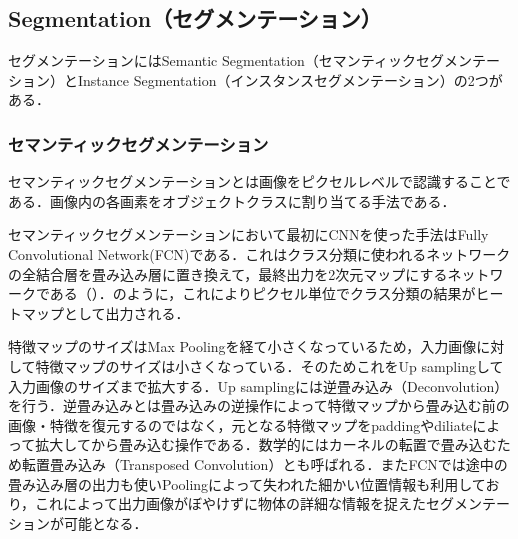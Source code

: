 \subsection{Segmentation（セグメンテーション）}
セグメンテーションにはSemantic Segmentation（セマンティックセグメンテーション）とInstance Segmentation（インスタンスセグメンテーション）の2つがある．


\subsubsection{セマンティックセグメンテーション}
セマンティックセグメンテーションとは画像をピクセルレベルで認識することである．画像内の各画素をオブジェクトクラスに割り当てる手法である．

セマンティックセグメンテーションにおいて最初にCNNを使った手法はFully Convolutional Network(FCN)である\cite{FCN}．これはクラス分類に使われるネットワークの全結合層を畳み込み層に置き換えて，最終出力を2次元マップにするネットワークである（）．のように，これによりピクセル単位でクラス分類の結果がヒートマップとして出力される．

特徴マップのサイズはMax Poolingを経て小さくなっているため，入力画像に対して特徴マップのサイズは小さくなっている．そのためこれをUp samplingして入力画像のサイズまで拡大する．Up samplingには逆畳み込み（Deconvolution）を行う．逆畳み込みとは畳み込みの逆操作によって特徴マップから畳み込む前の画像・特徴を復元するのではなく，元となる特徴マップをpaddingやdiliateによって拡大してから畳み込む操作である．数学的にはカーネルの転置で畳み込むため転置畳み込み（Transposed Convolution）とも呼ばれる．またFCNでは途中の畳み込み層の出力も使いPoolingによって失われた細かい位置情報も利用しており，これによって出力画像がぼやけずに物体の詳細な情報を捉えたセグメンテーションが可能となる．

